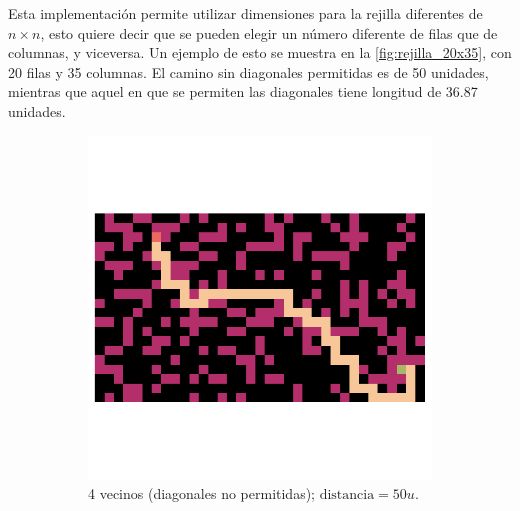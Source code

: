 \begin{enumerate}
\begin{solution}
        Esta implementación permite utilizar dimensiones para la rejilla diferentes de $n \times n$, esto quiere decir que se pueden elegir un número diferente de filas que de columnas, y viceversa. Un ejemplo de esto se muestra en la \cref{fig:rejilla_20x35}, con 20 filas y 35 columnas. El camino sin diagonales permitidas es de 50 unidades, mientras que aquel en que se permiten las diagonales tiene longitud de 36.87 unidades.
        \begin{figure}[ht!]
            \centering
            \begin{subfigure}{0.4\textwidth}
                \centering
                \includegraphics[scale=0.3]{../figures/path_02.png}
                \caption{4 vecinos (diagonales no permitidas); $\text{distancia} = 50 u$.}
            \end{subfigure}
            \hspace{1cm}
            \begin{subfigure}{0.4\textwidth}
                \centering

\end{subfigure}
\end{figure}
\end{solution}
\end{enumerate}
